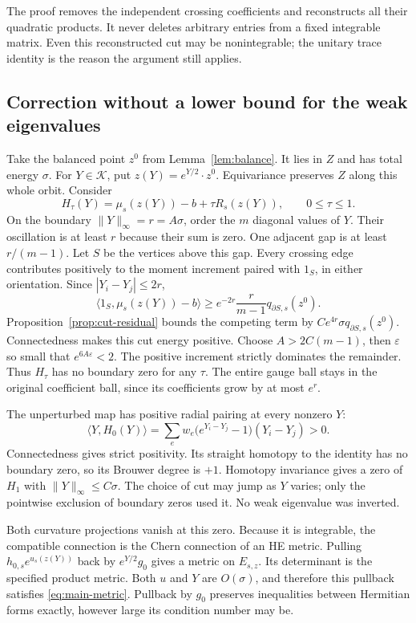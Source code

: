\documentclass[11pt]{amsart}
\theoremstyle{definition}
\theoremstyle{remark}
\newcommand{\cK}{\mathcal K}
\begin{document}
The proof removes the independent crossing coefficients and reconstructs
all their quadratic products. It never deletes arbitrary entries from a
fixed integrable matrix. Even this reconstructed cut may be nonintegrable;
the unitary trace identity is the reason the argument still applies.

\subsection{Correction without a lower bound for the weak eigenvalues}
Take the balanced point $z^0$ from Lemma~\ref{lem:balance}. It lies in
$Z$ and has total energy $\sigma$. For $Y\in\cK$, put
$z(Y)=e^{Y/2}\cdot z^0$. Equivariance preserves $Z$ along this whole
orbit. Consider
\[
 H_\tau(Y)=\mu_s(z(Y))-b+\tau R_s(z(Y)),\qquad 0\le\tau\le1.
\]
On the boundary $\|Y\|_\infty=r=A\sigma$, order the $m$ diagonal
values of $Y$. Their oscillation is at least $r$ because their sum is
zero. One adjacent gap is at least $r/(m-1)$. Let $S$ be the vertices
above this gap. Every crossing edge contributes positively to the moment
increment paired with $1_S$, in either orientation. Since
$|Y_i-Y_j|\le2r$,
\begin{equation}\label{eq:moment-cut-increment}
 \langle1_S,\mu_s(z(Y))-b\rangle
 \ge e^{-2r}\frac{r}{m-1}q_{\partial S,s}(z^0).
\end{equation}
Proposition~\ref{prop:cut-residual} bounds the competing term by
$Ce^{4r}\sigma q_{\partial S,s}(z^0)$. Connectedness makes this cut
energy positive. Choose $A>2C(m-1)$, then $\varepsilon$ so small that
$e^{6A\varepsilon}<2$. The positive increment strictly dominates the
remainder. Thus $H_\tau$ has no boundary zero for any $\tau$.
The entire gauge ball stays in the original coefficient ball, since its
coefficients grow by at most $e^r$.

The unperturbed map has positive radial pairing at every nonzero $Y$:
\[
 \langle Y,H_0(Y)\rangle
 =\sum_ew_e\bigl(e^{Y_i-Y_j}-1\bigr)(Y_i-Y_j)>0.
\]
Connectedness gives strict positivity. Its straight homotopy to the identity
has no boundary zero, so its Brouwer degree is $+1$. Homotopy invariance
gives a zero of $H_1$ with $\|Y\|_\infty\le C\sigma$. The choice
of cut may jump as $Y$ varies; only the pointwise exclusion of boundary
zeros used it. No weak eigenvalue was inverted.

Both curvature projections vanish at this zero. Because it is integrable,
the compatible connection is the Chern connection of an HE metric.
Pulling $h_{0,s}e^{u_s(z(Y))}$ back by $e^{Y/2}g_0$ gives a metric on
$E_{s,z}$. Its determinant is the specified product metric. Both $u$ and
$Y$ are $O(\sigma)$, and therefore this pullback satisfies
\eqref{eq:main-metric}. Pullback by $g_0$ preserves inequalities between
Hermitian forms exactly, however large its condition number may be.
\end{document}
